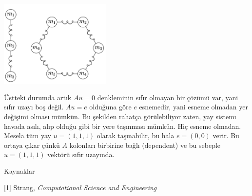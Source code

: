 \documentclass[12pt,fleqn]{article}\usepackage{../../common}
\begin{document}
\includegraphics[width=15em]{compscieng_1_08_03.png}

Üstteki durumda artık $A u = 0$ denkleminin sıfır olmayan bir çözümü var, yani
sıfır uzayı boş değil. $Au = e$ olduğuna göre $e$ esnemedir, yani esneme olmadan
yer değişimi olması mümkün. Bu şekilden rahatça görülebiliyor zaten, yay sistemı
havada asılı, alıp olduğu gibi bir yere taşınması mümkün. Hiç esneme olmadan.
Mesela tüm yay $u = (1,1,1)$ olarak taşınabilir, bu hala $e = (0,0)$ verir.
Bu ortaya çıkar çünkü $A$ kolonları birbirine bağlı (dependent) ve bu sebeple
$u = (1,1,1)$ vektörü sıfır uzayında.

Kaynaklar

[1] Strang, {\em Computational Science and Engineering}
\end{document}
